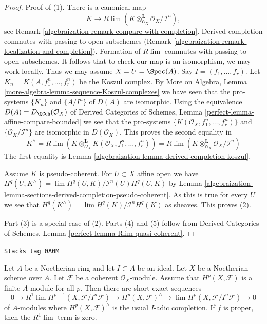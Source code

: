 \begin{proof}

Proof of (1). There is a canonical map
$$
K \longrightarrow
R\lim (K \otimes_{\mathcal{O}_X}^\mathbf{L} \mathcal{O}_X/\mathcal{I}^n),
$$
see Remark \ref{algebraization-remark-compare-with-completion}.
Derived completion commutes with passing to open subschemes
(Remark \ref{algebraization-remark-localization-and-completion}).
Formation of $R\lim$ commutes with passing to open subschemes.
It follows that to check our map is an isomorphism, we may work locally.
Thus we may assume $X = U = \Spec(A)$.
Say $I = (f_1, \ldots, f_r)$. Let
$K_n = K(A, f_1^n, \ldots, f_r^n)$ be the Koszul complex.
By More on Algebra, Lemma \ref{more-algebra-lemma-sequence-Koszul-complexes}
we have seen that the pro-systems $\{K_n\}$ and
$\{A/I^n\}$ of $D(A)$ are isomorphic.
Using the equivalence $D(A) = D_{\QCoh}(\mathcal{O}_X)$
of Derived Categories of Schemes, Lemma
\ref{perfect-lemma-affine-compare-bounded}
we see that the pro-systems $\{K(\mathcal{O}_X, f_1^n, \ldots, f_r^n)\}$
and $\{\mathcal{O}_X/\mathcal{I}^n\}$ are isomorphic in
$D(\mathcal{O}_X)$. This proves the second equality in
$$
K^\wedge = R\lim \left(
K \otimes_{\mathcal{O}_X}^\mathbf{L} K(\mathcal{O}_X, f_1^n, \ldots, f_r^n)
\right) =
R\lim (K \otimes_{\mathcal{O}_X}^\mathbf{L} \mathcal{O}_X/\mathcal{I}^n)
$$
The first equality is
Lemma \ref{algebraization-lemma-derived-completion-koszul}.

\medskip\noindent
Assume $K$ is pseudo-coherent. For $U \subset X$ affine open
we have $H^q(U, K^\wedge) = \lim H^q(U, K)/\mathcal{I}^n(U)H^q(U, K)$
by Lemma \ref{algebraization-lemma-sections-derived-completion-pseudo-coherent}.
As this is true for every $U$ we see that
$H^q(K^\wedge) = \lim H^q(K)/\mathcal{I}^nH^q(K)$ as sheaves.
This proves (2).

\medskip\noindent
Part (3) is a special case of (2).
Parts (4) and (5) follow from
Derived Categories of Schemes, Lemma
\ref{perfect-lemma-Rlim-quasi-coherent}.
\end{proof}

\begin{lemma}
\label{algebraization-lemma-formal-functions}
\href{https://stacks.math.columbia.edu/tag/0A0M}{\texttt{Stacks tag 0A0M}}

Let $A$ be a Noetherian ring and let $I \subset A$ be an ideal. Let $X$ be a
Noetherian scheme over $A$. Let $\mathcal{F}$ be a coherent
$\mathcal{O}_X$-module. Assume that $H^p(X, \mathcal{F})$ is
a finite $A$-module for all $p$. Then there are short exact sequences
$$
0 \to R^1\lim H^{p - 1}(X, \mathcal{F}/I^n\mathcal{F}) \to
H^p(X, \mathcal{F})^\wedge \to \lim H^p(X, \mathcal{F}/I^n\mathcal{F}) \to 0
$$
of $A$-modules where $H^p(X, \mathcal{F})^\wedge$ is the usual $I$-adic
completion. If $f$ is proper, then the $R^1\lim$ term is zero.
\end{lemma}


